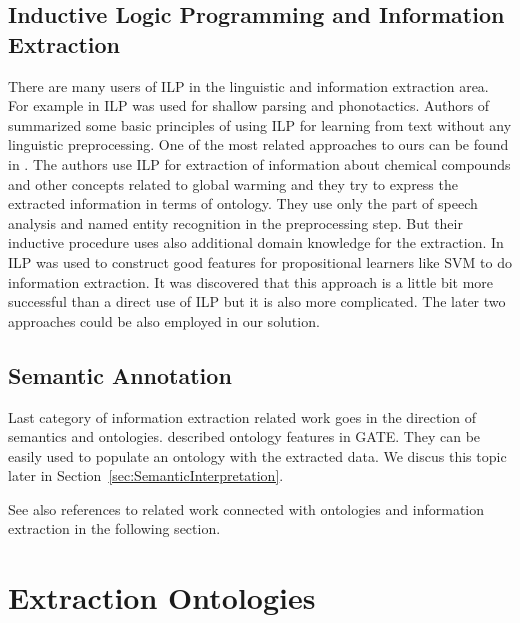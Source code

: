 \subsection{Inductive Logic Programming and Information Extraction}
There are many users of ILP in the linguistic and information extraction area.
For example in \citep{stasinos:phd} ILP was used for shallow parsing and phonotactics.
Authors of \citep{Junker99learningfor} summarized some basic principles of using ILP for learning from text without any linguistic preprocessing. One of the most related approaches to ours can be found in \citep{aitken02:_learn_infor_extrac_rules}. The authors use ILP for extraction of information about chemical compounds and other concepts related to global warming and they try to express the extracted information in terms of ontology. They use only the part of speech analysis and named entity recognition in the preprocessing step. But their inductive procedure uses also additional domain knowledge for the extraction. In \citep{DBLP:conf/ilp/RamakrishnanJBS07} ILP was used to construct good features for propositional learners like SVM to do information extraction. It was discovered that this approach is a little bit more successful than a direct use of ILP but it is also more complicated. The later two approaches could be also employed in our solution.



\subsection{Semantic Annotation}
Last category of information extraction related work goes in the direction of semantics and ontologies. \cite{Bon04b} described  ontology features in GATE. They can be easily used to populate an ontology with the extracted data. We discus this topic later in Section~\ref{sec:SemanticInterpretation}.

See also references to related work connected with ontologies and information extraction in the following section. 


\section{Extraction Ontologies} \label{sec:relwork_ext_ont}


